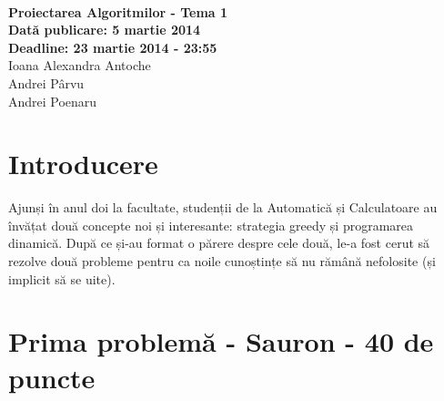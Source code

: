 \documentclass[a4paper,5pt]{article}
\begin{document}
\hspace{2mm}\\[7cm]

\begin{center}

\Large
\textbf{Proiectarea Algoritmilor - Tema 1}\\[10mm]
\large
\textbf{Dată publicare: 5 martie 2014}\\[5mm]
\textbf{Deadline: 23 martie 2014 - 23:55}\\[5mm]
{\hspace{0.7mm} Ioana Alexandra Antoche}\\
{\hspace{0.7mm} Andrei Pârvu}\\
{\hspace{0.7mm} Andrei Poenaru}\\

\end{center}

\newpage

\normalsize

\section{Introducere}

Ajunși în anul doi la facultate, studenții de la Automatică și Calculatoare au
învățat două concepte noi și interesante: strategia greedy și programarea
dinamică. După ce și-au format o părere despre cele două, le-a fost cerut
să rezolve două probleme pentru ca noile cunoștințe să nu rămână nefolosite
(și implicit să se uite).

\normalsize

\section{Prima problemă - Sauron - 40 de puncte}
\end{document}
